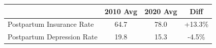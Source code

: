 \begin{tabular}{lccc}
\toprule
& 2010 Avg & 2020 Avg & Diff \\
\midrule
Postpartum Insurance Rate & 64.7 & 78.0 & +13.3\% \\
Postpartum Depression Rate & 19.8 & 15.3 &  -4.5\% \\
\bottomrule
\end{tabular}
